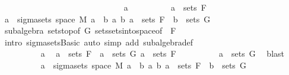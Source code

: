 \begin{isabellebody}
\ \ \ \ \ \ \isacommand{{\isacharbraceright}{\kern0pt}}\isamarkupfalse%
\isanewline
\ \ \ \ \ \ \isamarkupfalse%
\isanewline
\ \ \ \ \ \ \isacommand{{\isacharbraceleft}{\kern0pt}}\isamarkupfalse%
\isanewline
\ \ \ \ \ \ \ \ \isamarkupfalse%
\ a\isanewline
\ \ \ \ \ \ \ \ \isamarkupfalse%
\ {\isachardoublequoteopen}a\ {\isasymin}\ sets\ F{\isachardoublequoteclose}\isanewline
\ \ \ \ \ \ \ \ \isamarkupfalse%
\ {\isachardoublequoteopen}a\ {\isasymin}\ sigma{\isacharunderscore}{\kern0pt}sets\ {\isacharparenleft}{\kern0pt}space\ M{\isacharparenright}{\kern0pt}\ {\isacharbraceleft}{\kern0pt}a\ {\isasyminter}\ b\ {\isacharbar}{\kern0pt}a\ b{\isachardot}{\kern0pt}\ a\ {\isasymin}\ sets\ F\ {\isasymand}\ b\ {\isasymin}\ sets\ G{\isacharbraceright}{\kern0pt}{\isachardoublequoteclose}\isanewline
\ \ \ \ \ \ \ \ \ \ \isamarkupfalse%
\ subalgebra\ sets{\isachardot}{\kern0pt}top{\isacharbrackleft}{\kern0pt}of\ G{\isacharbrackright}{\kern0pt}\ sets{\isachardot}{\kern0pt}sets{\isacharunderscore}{\kern0pt}into{\isacharunderscore}{\kern0pt}space{\isacharbrackleft}{\kern0pt}of\ {\isacharunderscore}{\kern0pt}\ F{\isacharbrackright}{\kern0pt}\ \isanewline
\ \ \ \ \ \ \ \ \ \ \isamarkupfalse%
\ {\isacharparenleft}{\kern0pt}intro\ sigma{\isacharunderscore}{\kern0pt}sets{\isachardot}{\kern0pt}Basic{\isacharcomma}{\kern0pt}\ auto\ simp\ add{\isacharcolon}{\kern0pt}\ subalgebra{\isacharunderscore}{\kern0pt}def{\isacharparenright}{\kern0pt}\isanewline
\ \ \ \ \ \ \isacommand{{\isacharbraceright}{\kern0pt}}\isamarkupfalse%
\isanewline
\ \ \ \ \ \ \isamarkupfalse%
\isanewline
\ \ \ \ \ \ \isacommand{{\isacharbraceleft}{\kern0pt}}\isamarkupfalse%
\isanewline
\ \ \ \ \ \ \ \ \isamarkupfalse%
\ a\ \isamarkupfalse%
\ {\isachardoublequoteopen}a\ {\isasymin}\ sets\ F\ {\isasymor}\ a\ {\isasymin}\ sets\ G{\isachardoublequoteclose}\ {\isachardoublequoteopen}a\ {\isasymnotin}\ sets\ F{\isachardoublequoteclose}\isanewline
\ \ \ \ \ \ \ \ \isamarkupfalse%
\ {\isachardoublequoteopen}a\ {\isasymin}\ sets\ G{\isachardoublequoteclose}\ \isamarkupfalse%
\ blast\isanewline
\ \ \ \ \ \ \ \ \isamarkupfalse%
\ {\isachardoublequoteopen}a\ {\isasymin}\ sigma{\isacharunderscore}{\kern0pt}sets\ {\isacharparenleft}{\kern0pt}space\ M{\isacharparenright}{\kern0pt}\ {\isacharbraceleft}{\kern0pt}a\ {\isasyminter}\ b\ {\isacharbar}{\kern0pt}a\ b{\isachardot}{\kern0pt}\ a\ {\isasymin}\ sets\ F\ {\isasymand}\ b\ {\isasymin}\ sets\ G{\isacharbraceright}{\kern0pt}{\isachardoublequoteclose}\ \isanewline

\end{isabellebody}
